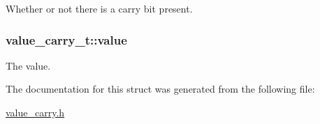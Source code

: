 Whether or not there is a carry bit present. 

\subsubsection[{\texorpdfstring{value}{value}}]{ value\+\_\+carry\+\_\+t\+::value}\hypertarget{structvalue__carry__t_a4ee942fb80f5e029be0e70fb36fbe7d2}{}\label{structvalue__carry__t_a4ee942fb80f5e029be0e70fb36fbe7d2}


The value. 



The documentation for this struct was generated from the following file\+:\begin{DoxyCompactItemize}
\item 
\hyperlink{value__carry_8h}{value\+\_\+carry.\+h}\end{DoxyCompactItemize}
